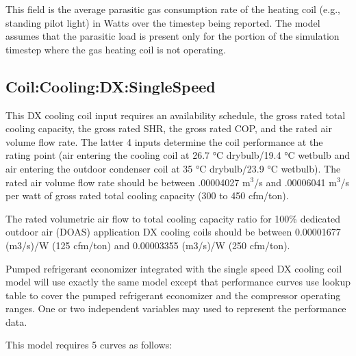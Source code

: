 This field is the average parasitic gas consumption rate of the heating coil (e.g., standing pilot light) in Watts over the timestep being reported. The model assumes that the parasitic load is present only for the portion of the simulation timestep where the gas heating coil is not operating.



















\subsection{Coil:Cooling:DX:SingleSpeed}\label{coilcoolingdxsinglespeed}

This DX cooling coil input requires an availability schedule, the gross rated total cooling capacity, the gross rated SHR, the gross rated COP, and the rated air volume flow rate. The latter 4 inputs determine the coil performance at the rating point (air entering the cooling coil at 26.7 °C drybulb/19.4 °C wetbulb and air entering the outdoor condenser coil at 35 °C drybulb/23.9 °C wetbulb). The rated air volume flow rate should be between .00004027 m\(^{3}\)/s and .00006041 m\(^{3}\)/s per watt of gross rated total cooling capacity (300 to 450 cfm/ton).

The rated volumetric air flow to total cooling capacity ratio for 100\% dedicated outdoor air (DOAS) application DX cooling coils should be between 0.00001677 (m3/s)/W (125 cfm/ton) and 0.00003355 (m3/s)/W (250 cfm/ton).

Pumped refrigerant economizer integrated with the single speed DX cooling coil model will use exactly the same model except that performance curves use lookup table to cover the pumped refrigerant economizer and the compressor operating ranges. One or two independent variables may used to represent the performance data.

This model requires 5 curves as follows:

